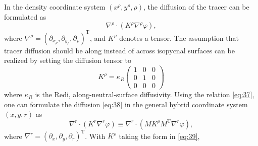 \documentclass[12pt]{report}
\def\p{\partial}
\begin{document}
In the density coordinate system $(x^\rho, y^\rho, \rho)$, the
diffusion of the tracer can be formulated as
\begin{equation}
  \label{eq:38}
  \nabla^\rho\cdot(K^\rho\nabla^\rho\varphi),
\end{equation}
where $\nabla^\rho = (\p_{x_\rho}, \p_{y_\rho}, \p_\rho)^\textrm{T}$, and $K^\rho$
denotes a tensor. The assumption that tracer diffusion should be along
instead of across isopycnal surfaces can be realized by setting the
diffusion tensor to
\begin{equation}
  \label{eq:39}
  K^\rho = \kappa_R \left(
    \begin{matrix}
      1 & 0 & 0\\
      0 & 1 & 0\\
      0 & 0 & 0
    \end{matrix}\right)
\end{equation}
where $\kappa_R$ is the Redi, along-neutral-surface diffusivity.
Using the relation \eqref{eq:37}, one can formulate the diffusion
\eqref{eq:38} in the general hybrid coordinate system $(x, y, r)$ as
\begin{equation}
  \label{eq:40}
  \nabla^r\cdot(K^r\nabla^r\varphi) \equiv  \nabla^r\cdot(MK^\rho
  M^\textrm{T}\nabla^r\varphi), 
\end{equation}
where $\nabla^r = (\p_x, \p_y, \p_r)^\textrm{T}$. With $K^\rho$ taking
the form in \eqref{eq:39}, 
\end{document}
